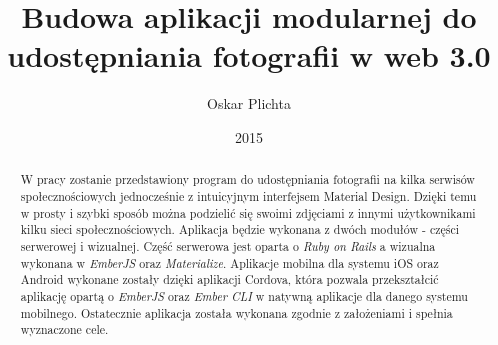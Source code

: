 \documentclass[brudnopis]{xmgr}
\author   {Oskar Plichta}
\title    {Budowa aplikacji modularnej do udostępniania fotografii  w web 3.0}
\date     {2015}
\begin{document}
\begin{abstract}

W pracy zostanie przedstawiony program do udostępniania fotografii na kilka serwisów społecznościowych jednocześnie z intuicyjnym interfejsem Material Design. Dzięki temu w prosty i szybki sposób można podzielić się swoimi zdjęciami z innymi użytkownikami kilku sieci społecznościowych. Aplikacja będzie wykonana z dwóch modułów - części serwerowej i wizualnej. Część serwerowa jest oparta o \textit{Ruby on Rails} a wizualna wykonana w \textit{EmberJS} oraz \textit{Materialize}. Aplikacje mobilna dla systemu iOS oraz Android wykonane zostały dzięki aplikacji Cordova, która pozwala przekształcić aplikację opartą o \textit{EmberJS} oraz \textit{Ember CLI} w natywną aplikacje dla danego systemu mobilnego. Ostatecznie aplikacja została wykonana zgodnie z założeniami i spełnia wyznaczone cele.

\end{abstract}
\end{document}
